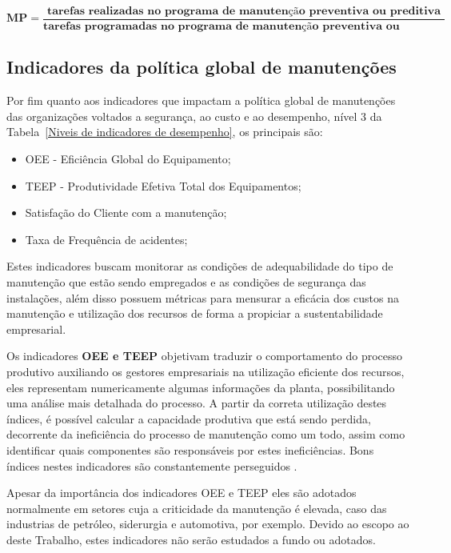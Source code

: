\begin{equation}
\label{eqn06}
	\mathbf{MP} = \mathbf{\frac{\textrm{tarefas realizadas no programa de manutenção preventiva ou preditiva}}{\textrm{tarefas programadas no programa de manutenção preventiva ou preditiva}}} 
\end{equation}

\subsection{Indicadores da política global de manutenções}
\label{nivel 3}

Por fim quanto aos indicadores que impactam a política global de manutenções das organizações voltados a segurança, ao custo e ao desempenho, nível 3 da Tabela~\ref{Niveis de indicadores de desempenho}, os principais são:

\begin{itemize}
	\item OEE - Eficiência Global do Equipamento;
	\item TEEP - Produtividade Efetiva Total dos Equipamentos;
	\item Satisfação do Cliente com a manutenção;	
	\item Taxa de Frequência de acidentes;
	\end{itemize}

Estes indicadores buscam monitorar as condições de adequabilidade do tipo de manutenção que estão sendo empregados e as condições de segurança das instalações, além disso possuem métricas para mensurar a eficácia dos custos na manutenção e utilização dos recursos de forma a propiciar a sustentabilidade empresarial.

Os indicadores \textbf{OEE e TEEP} objetivam traduzir o comportamento do processo produtivo auxiliando os gestores empresariais na utilização eficiente dos recursos, eles representam numericamente algumas informações da planta, possibilitando uma análise mais detalhada do processo. A partir da correta utilização destes índices, é possível calcular a capacidade produtiva que está sendo perdida, decorrente da ineficiência do processo de manutenção como um todo, assim como identificar quais componentes são responsáveis por estes ineficiências. Bons índices nestes indicadores são constantemente perseguidos \cite{de1999analise}.

Apesar da importância dos indicadores OEE e TEEP eles são adotados normalmente em setores cuja a criticidade da manutenção é elevada, caso das industrias de petróleo, siderurgia e automotiva, por exemplo. Devido ao escopo ao deste Trabalho, estes indicadores não serão estudados a fundo ou adotados.

